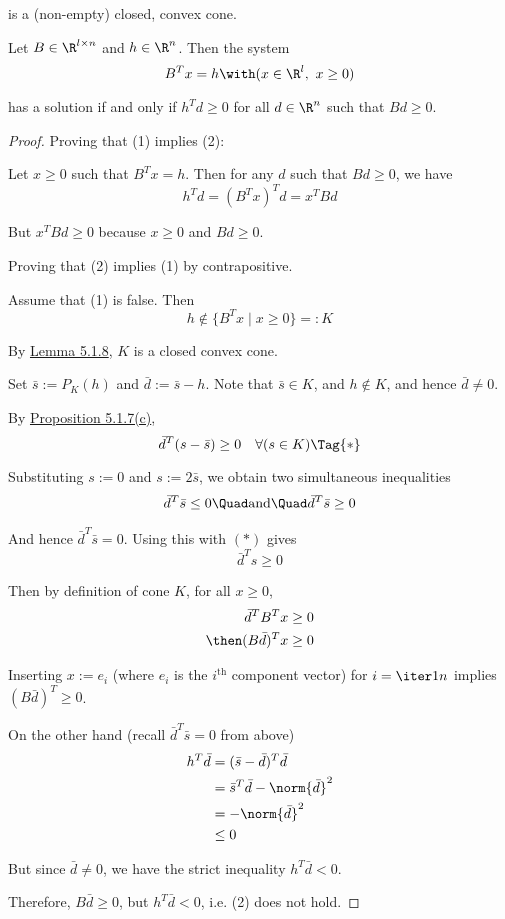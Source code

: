 is a (non-empty) closed, convex cone.

\label{d64b0db}

Let $B\in\R^{l\times n}$ and $h\in\R^n$. Then the system
$$
	B^Tx=h\with(x\in\R^l,\ x\geq0)
$$

has a solution if and only if $h^Td\geq0$ for all $d\in\R^n$ such that
$Bd\geq0$.

\begin{proof}
	Proving that (1) implies (2):

	Let $x\geq0$ such that $B^Tx=h$. Then for any $d$ such that
	$Bd\geq0$, we have
	$$
		h^Td=(B^Tx)^Td=x^TBd
	$$

	But $x^TBd\geq0$ because $x\geq0$ and $Bd\geq0$.

	Proving that (2) implies (1) by contrapositive.

	Assume that (1) is false. Then
	$$
		h\notin\{B^Tx \mid x\geq0\}=:K
	$$

	By \href{d2dff14}{Lemma 5.1.8}, $K$ is a closed convex cone.

	Set $\bar s:=P_K(h)$ and $\bar d:=\bar s-h$. Note that $\bar
		s\in K$, and $h\notin K$, and hence $\bar d\neq0$.

	By \href{ce30ae7}{Proposition 5.1.7(c)},
	\begin{equation*}
		\bar d^T(s-\bar s)\geq0\quad\forall(s\in K)\Tag{*}
	\end{equation*}

	Substituting $s:=0$ and $s:=2\bar s$, we obtain two simultaneous
	inequalities
	\begin{align*}
		\bar d^T\bar s\leq0\Quad\text{and}\Quad\bar d^T\bar s\geq0
	\end{align*}

	And hence $\bar d^T\bar s=0$. Using this with $(*)$ gives
	$$
		\bar d^Ts\geq0
	$$

	Then by definition of cone $K$, for all $x\geq0$,
	\begin{align*}
		\bar d^T B^Tx     & \geq0 \\
		\then(B\bar d)^Tx & \geq0
	\end{align*}

	Inserting $x:=e_i$ (where $e_i$ is the $i^\text{th}$ component
	vector) for $i=\iter1n$ implies $(B\bar d)^T\geq0$.

  On the other hand (recall $\bar d^T\bar s=0$ from above)
	\begin{align*}
		h^T\bar d & =(\bar s-\bar d)^T\bar d        \\
		          & =\bar s^T\bar d-\norm{\bar d}^2 \\
		          & =-\norm{\bar d}^2               \\
		          & \leq 0
	\end{align*}

  But since $\bar d\neq0$, we have the strict inequality $h^T\bar
  d<0$.

	Therefore, $B\bar d\geq0$, but $h^T\bar d<0$, i.e. (2) does not
	hold.
\end{proof}

